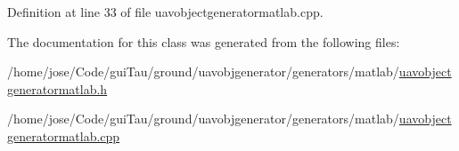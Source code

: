 Definition at line 33 of file uavobjectgeneratormatlab.\-cpp.



The documentation for this class was generated from the following files\-:\begin{DoxyCompactItemize}
\item 
/home/jose/\-Code/gui\-Tau/ground/uavobjgenerator/generators/matlab/\hyperlink{uavobjectgeneratormatlab_8h}{uavobjectgeneratormatlab.\-h}\item 
/home/jose/\-Code/gui\-Tau/ground/uavobjgenerator/generators/matlab/\hyperlink{uavobjectgeneratormatlab_8cpp}{uavobjectgeneratormatlab.\-cpp}\end{DoxyCompactItemize}
